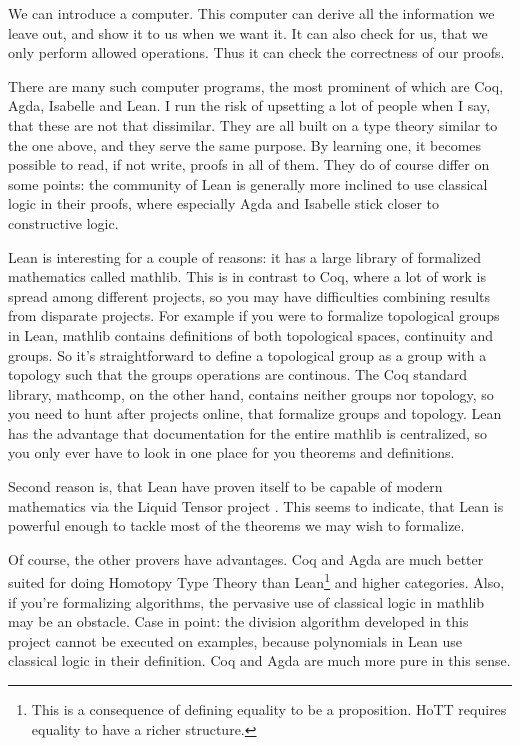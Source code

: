 \documentclass[a4paper, 12pt]{article}
\theoremstyle{changedot}
\theoremstyle{changedotbreak}
\theoremstyle{nonumberplain}
\begin{document}
We can introduce a computer. This computer can derive all the information we leave out, and show it to us when we want it. It can also check for us, that we only perform allowed operations. Thus it can check the correctness of our proofs.

There are many such computer programs, the most prominent of which are Coq, Agda, Isabelle and Lean. I run the risk of upsetting a lot of people when I say, that these are not that dissimilar. They are all built on a type theory similar to the one above, and they serve the same purpose. By learning one, it becomes possible to read, if not write, proofs in all of them. They do of course differ on some points: the community of Lean is generally more inclined to use classical logic in their proofs, where especially Agda and Isabelle stick closer to constructive logic.

Lean is interesting for a couple of reasons: it has a large library of formalized mathematics called mathlib. This is in contrast to Coq, where a lot of work is spread among different projects, so you may have difficulties combining results from disparate projects. For example if you were to formalize topological groups in Lean, mathlib contains definitions of both topological spaces, continuity and groups. So it's straightforward to define a topological group as a group with a topology such that the groups operations are continous. The Coq standard library, mathcomp, on the other hand, contains neither groups nor topology, so you need to hunt after projects online, that formalize groups and topology. Lean has the advantage that documentation for the entire mathlib is centralized, so you only ever have to look in one place for you theorems and definitions.

Second reason is, that Lean have proven itself to be capable of modern mathematics via the Liquid Tensor project \cite{LiquidTensor}. This seems to indicate, that Lean is powerful enough to tackle most of the theorems we may wish to formalize.

Of course, the other provers have advantages. Coq and Agda are much better suited for doing Homotopy Type Theory than Lean\footnote{This is a consequence of defining equality to be a proposition. HoTT requires equality to have a richer structure.}  and higher categories. Also, if you're formalizing algorithms, the pervasive use of classical logic in mathlib may be an obstacle. Case in point: the division algorithm developed in this project cannot be executed on examples, because polynomials in Lean use classical logic in their definition. Coq and Agda are much more pure in this sense.
\end{document}

